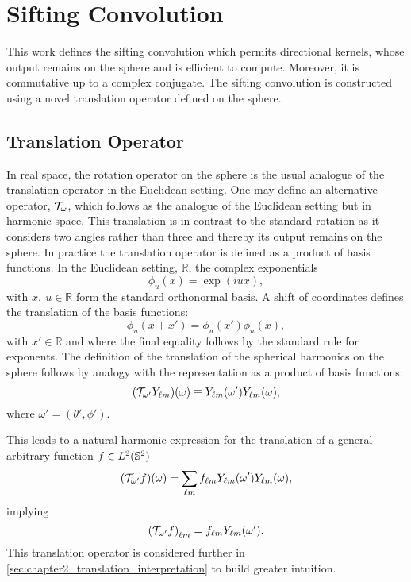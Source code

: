 

\section{Sifting Convolution}\label{sec:chapter2_sifting_convolution}

This work defines the sifting convolution which permits directional kernels, whose output remains on the sphere and is efficient to compute.
Moreover, it is commutative up to a complex conjugate.
The sifting convolution is constructed using a novel translation operator defined on the sphere.

\subsection{Translation Operator}\label{sec:chapter2_translation_operator}

In real space, the rotation operator on the sphere is the usual analogue of the translation operator in the Euclidean setting.
One may define an alternative operator, \(\translation{\omega}\), which follows as the analogue of the Euclidean setting but in harmonic space.
This translation is in contrast to the standard rotation as it considers two angles rather than three and thereby its output remains on the sphere.
In practice the translation operator is defined as a product of basis functions.
In the Euclidean setting, \eg{} \(\mathbb{R}\), the complex exponentials
%
\begin{equation}
	\phi_{u}(x)
	= \exp(iux),
\end{equation}
%
with \(x,\ u \in \mathbb{R}\) form the standard orthonormal basis.
A shift of coordinates defines the translation of the basis functions:
%
\begin{equation}
	\phi_{u}(x + x')
	= \phi_{u}(x') \phi_{u}(x),
\end{equation}
%
with \(x' \in \mathbb{R}\) and where the final equality follows by the standard rule for exponents.
The definition of the translation of the spherical harmonics on the sphere follows by analogy with the representation as a product of basis functions:
%
\begin{equation}
	\pixel{(\translation{\omega'}\harmonic{Y})} \equiv \pixel[']{\harmonic{Y}} \pixel{\harmonic{Y}},
\end{equation}
%
where \(\omega'=(\theta',\phi')\).

This leads to a natural harmonic expression for the translation of a general arbitrary function \(f \in \hilbert{\twoSphere}\)
%
\begin{equation}\label{eq:chapter2_translation_real}
	\pixel{(\translation{\omega'}f)}
	= \harmonicSum \harmonic{f} \pixel[']{\harmonic{Y}} \pixel{\harmonic{Y}},
\end{equation}
%
implying
%
\begin{equation}\label{eq:chapter2_translation_harmonic}
	\harmonic{(\translation{\omega'}f)}
	= \harmonic{f} \pixel[']{\harmonic{Y}}.
\end{equation}
%
This translation operator is considered further in \cref{sec:chapter2_translation_interpretation} to build greater intuition.

